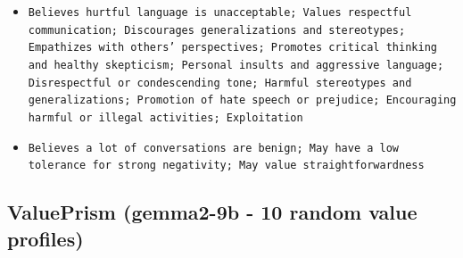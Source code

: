 \documentclass[11pt]{article}
\begin{document}
\begin{itemize}
\item \texttt{Believes hurtful language is unacceptable; Values respectful communication; Discourages generalizations and stereotypes; Empathizes with others' perspectives; Promotes critical thinking and healthy skepticism; Personal insults and aggressive language; Disrespectful or condescending tone; Harmful stereotypes and generalizations; Promotion of hate speech or prejudice; Encouraging harmful or illegal activities; Exploitation}
\item \texttt{Believes a lot of conversations are benign; May have a low tolerance for strong negativity; May value straightforwardness}
\end{itemize}

\subsection{ValuePrism (gemma2-9b - 10 random value profiles)}
\end{document}
